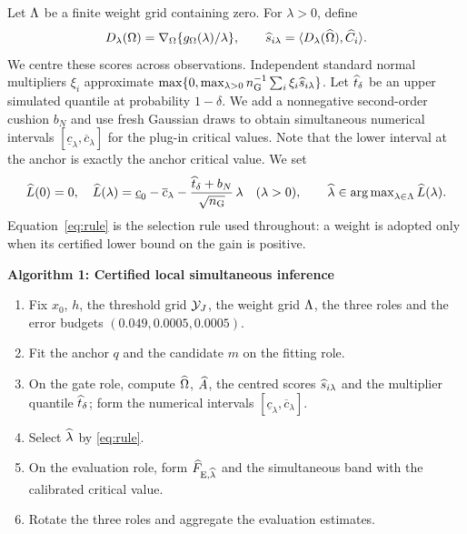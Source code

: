 Let $\Lambda$ be a finite weight grid containing zero. For $\lambda>0$, define
\begin{equation}\label{eq:gradient}
 D_\lambda(\Omega)=\nabla_\Omega\{g_\Omega(\lambda)/\lambda\},\qquad
 \widehat s_{i\lambda}=\langle D_\lambda(\widehat\Omega),\widehat C_i\rangle.
\end{equation}
We centre these scores across observations. Independent standard normal multipliers $\xi_i$ approximate
$\max\{0,\max_{\lambda>0}n_{\mathrm{G}}^{-1}\sum_i\xi_i\widehat s_{i\lambda}\}$.
Let $\widehat t_\delta$ be an upper simulated quantile at probability $1-\delta$. We add a nonnegative second-order cushion $b_N$ and use fresh Gaussian draws to obtain simultaneous numerical intervals $[\underline c_\lambda,\overline c_\lambda]$ for the plug-in critical values. Note that the lower interval at the anchor is exactly the anchor critical value. We set
\begin{equation}\label{eq:rule}
 \widehat L(0)=0,\quad
 \widehat L(\lambda)=\underline c_0-\overline c_\lambda
                       -\frac{\widehat t_\delta+b_N}{\sqrt{n_{\mathrm{G}}}}\,\lambda
                       \quad(\lambda>0),\qquad
 \widehat\lambda\in\operatorname{arg\,max}_{\lambda\in\Lambda}\widehat L(\lambda).
\end{equation}
Equation~\eqref{eq:rule} is the selection rule used throughout: a weight is adopted only when its certified lower bound on the gain is positive.

\begin{procedurebox}
\textbf{Algorithm 1: Certified local simultaneous inference}
\begin{enumerate}
\item Fix $x_0$, $h$, the threshold grid $\mathcal Y_J$, the weight grid $\Lambda$, the three roles and the error budgets $(0.049,0.0005,0.0005)$.
\item Fit the anchor $q$ and the candidate $m$ on the fitting role.
\item On the gate role, compute $\widehat\Omega$, $\widehat A$, the centred scores $\widehat s_{i\lambda}$ and the multiplier quantile $\widehat t_\delta$; form the numerical intervals $[\underline c_\lambda,\overline c_\lambda]$.
\item Select $\widehat\lambda$ by \eqref{eq:rule}.
\item On the evaluation role, form $\widehat F_{\mathrm{E},\widehat\lambda}$ and the simultaneous band with the calibrated critical value.
\item Rotate the three roles and aggregate the evaluation estimates.
\end{enumerate}
\end{procedurebox}


